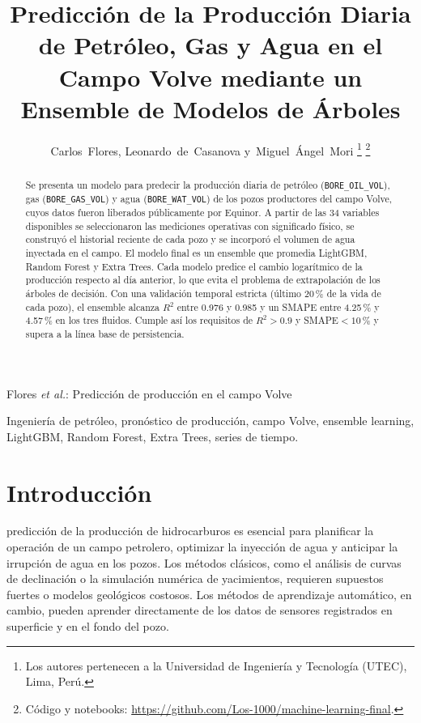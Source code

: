 \documentclass[journal]{IEEEtran}
\begin{document}
\title{Predicción de la Producción Diaria de Petróleo, Gas y Agua en el Campo Volve mediante un Ensemble de Modelos de Árboles}

\author{Carlos~Flores, Leonardo~de~Casanova y~Miguel~Ángel~Mori%
\thanks{Los autores pertenecen a la Universidad de Ingeniería y Tecnología (UTEC), Lima, Perú.}%
\thanks{Código y notebooks: \protect\url{https://github.com/Los-1000/machine-learning-final}.}}

%
{Flores \MakeLowercase{\textit{et al.}}: Predicción de producción en el campo Volve}

\maketitle

\begin{abstract}
Se presenta un modelo para predecir la producción diaria de petróleo (\texttt{BORE\_OIL\_VOL}), gas (\texttt{BORE\_GAS\_VOL}) y agua (\texttt{BORE\_WAT\_VOL}) de los pozos productores del campo Volve, cuyos datos fueron liberados públicamente por Equinor. A partir de las 34 variables disponibles se seleccionaron las mediciones operativas con significado físico, se construyó el historial reciente de cada pozo y se incorporó el volumen de agua inyectada en el campo. El modelo final es un ensemble que promedia LightGBM, Random Forest y Extra Trees. Cada modelo predice el cambio logarítmico de la producción respecto al día anterior, lo que evita el problema de extrapolación de los árboles de decisión. Con una validación temporal estricta (último 20\,\% de la vida de cada pozo), el ensemble alcanza $R^2$ entre 0.976 y 0.985 y un SMAPE entre 4.25\,\% y 4.57\,\% en los tres fluidos. Cumple así los requisitos de $R^2>0.9$ y SMAPE$<10$\,\% y supera a la línea base de persistencia.
\end{abstract}

\begin{IEEEkeywords}
Ingeniería de petróleo, pronóstico de producción, campo Volve, ensemble learning, LightGBM, Random Forest, Extra Trees, series de tiempo.
\end{IEEEkeywords}

\section{Introducción}
 predicción de la producción de hidrocarburos es esencial para planificar la operación de un campo petrolero, optimizar la inyección de agua y anticipar la irrupción de agua en los pozos. Los métodos clásicos, como el análisis de curvas de declinación o la simulación numérica de yacimientos, requieren supuestos fuertes o modelos geológicos costosos. Los métodos de aprendizaje automático, en cambio, pueden aprender directamente de los datos de sensores registrados en superficie y en el fondo del pozo.
\end{document}
